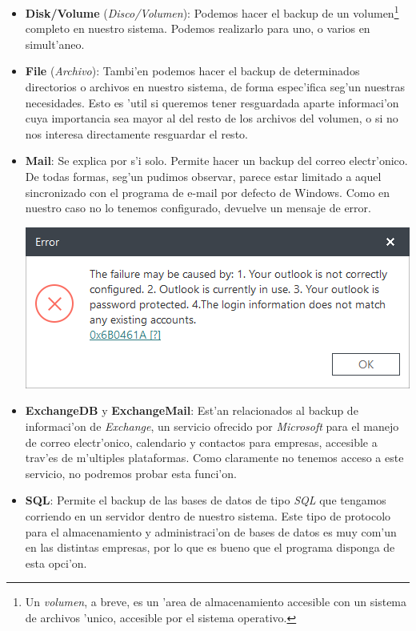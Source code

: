 \documentclass[11pt]{article}
\begin{document}
		\begin{itemize}
			\item \textbf{Disk/Volume} (\textit{Disco/Volumen}): Podemos hacer el backup de un volumen\footnote{Un \textit{volumen}, a breve, es un 'area de almacenamiento accesible con un sistema de archivos 'unico, accesible por el sistema operativo.} completo en nuestro sistema. Podemos realizarlo para uno, o varios en simult'aneo.
			\item \textbf{File} (\textit{Archivo}): Tambi'en podemos hacer el backup de determinados directorios o archivos en nuestro sistema, de forma espec'ifica seg'un nuestras necesidades. Esto es 'util si queremos tener resguardada aparte informaci'on cuya importancia sea mayor al del resto de los archivos del volumen, o si no nos interesa directamente resguardar el resto.
			\item \textbf{Mail}: Se explica por s'i solo. Permite hacer un backup del correo electr'onico. De todas formas, seg'un pudimos observar, parece estar limitado a aquel sincronizado con el programa de e-mail por defecto de Windows. Como en nuestro caso no lo tenemos configurado, devuelve un mensaje de error. \vspace{-7pt}

			\begin{center}
				\begin{minipage}{.6\linewidth}
					\centering
					\captionsetup{justification=centering}
					\includegraphics[width=.9\linewidth]{Images/easeus/use_mailerr}
				\end{minipage}
			\end{center}\vspace{3pt}
		
			\item \textbf{ExchangeDB} y \textbf{ExchangeMail}: Est'an relacionados al backup de informaci'on de \textit{Exchange}, un servicio ofrecido por \textit{Microsoft} para el manejo de correo electr'onico, calendario y contactos para empresas, accesible a trav'es de m'ultiples plataformas. Como claramente no tenemos acceso a este servicio, no podremos probar esta funci'on.
			\item \textbf{SQL}: Permite el backup de las bases de datos de tipo \textit{SQL} que tengamos corriendo en un servidor dentro de nuestro sistema. Este tipo de protocolo para el almacenamiento y administraci'on de bases de datos es muy com'un en las distintas empresas, por lo que es bueno que el programa disponga de esta opci'on.
		\end{itemize}
	
\end{document}
